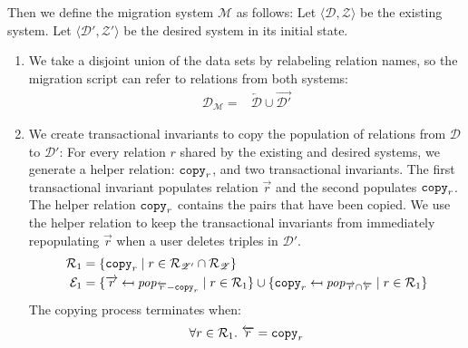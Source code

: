 \documentclass[runningheads]{llncs}
\newcommand{\id}[1]{\text{\it #1\/}}
\newcommand{\popF}[1]{\id{pop}_{#1}}
\newcommand{\pair}[2]{\langle{#1},{#2}\rangle}
\newcommand{\rels}{\mathcal{R}}   %
\newcommand{\transactions}{\mathcal{E}}
\newcommand{\dataset}{\mathscr{D}}
\newcommand{\schema}{\mathscr{Z}}
\newcommand{\migrsys}{\mathscr{M}}
\begin{document}
   Then we define the migration system $\migrsys$ as follows:
   Let $\pair{\dataset}{\schema}$ be the existing system.
   Let $\pair{\dataset'}{\schema'}$ be the desired system in its initial state.
\begin{enumerate}
\item We take a disjoint union of the data sets by relabeling relation names, so the migration script can refer to relations from both systems:
   \begin{align}
      \dataset_\migrsys={}&\overleftarrow{\dataset}\cup\overrightarrow{\dataset'}
   \end{align}
\item\label{step2} We create transactional invariants to copy the population of relations from $\dataset$ to $\dataset'$:
   For every relation $r$ shared by the existing and desired systems, we generate a helper relation: ${\tt copy}_r$, and two transactional invariants.
   The first transactional invariant populates relation $\overrightarrow{r}$ and the second populates ${\tt copy}_r$.
   The helper relation ${\tt copy}_r$ contains the pairs that have been copied.
   We use the helper relation to keep the transactional invariants from immediately repopulating $\overrightarrow{r}$ when a user deletes triples in $\dataset'$.
   \begin{align}
      \rels_1={}&\{{\tt copy}_r\mid r \in \rels_{\schema'}\cap\rels_{\schema}\}\label{eqn:copy relations}\\
      \transactions_1={}&\{\overrightarrow{r}\mapsfrom \popF{\overleftarrow{r}-{\tt copy}_r} \mid r \in\rels_1\}\cup\{{\tt copy}_r\mapsfrom \popF{\overrightarrow{r}\cap\overleftarrow{r}} \mid r \in\rels_1\}
   \end{align}
   The copying process terminates when:
   \begin{align}
      \forall r\in\rels_1.~\overleftarrow{r}={\tt copy}_r\label{eqn:copyingTerminates}
   \end{align}


\end{enumerate}
\end{document}
